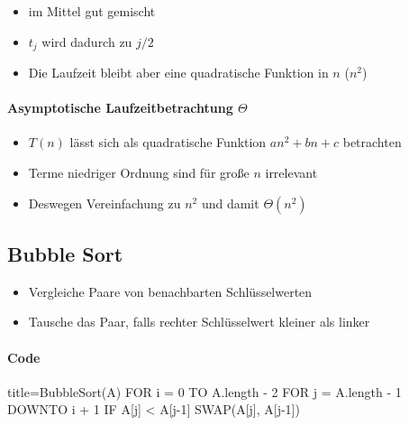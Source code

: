 \documentclass[
    ngerman,
    color=3b,
    dark_mode,
    load_common, %
    summary,
    boxarc,
]{rubos-tuda-template}
\begin{document}
\begin{description}[itemsep=1em]
    \item [\texttt{Average Case}]
          \begin{itemize}
              \item im Mittel gut gemischt
              \item $t_j$ wird dadurch zu $j/2$
              \item Die Laufzeit bleibt aber eine quadratische Funktion in $n$ ($n^2$)
          \end{itemize}
\end{description}

\paragraph{Asymptotische Laufzeitbetrachtung $\Theta$} {\label{insSortLaufzeitTheta}}
\begin{itemize}
    \item $T(n)$ lässt sich als quadratische Funktion $an^2 + bn + c$ betrachten
    \item Terme niedriger Ordnung sind für gro\ss e $n$ irrelevant
    \item Deswegen Vereinfachung zu $n^2$ und damit $\Theta(n^2)$
\end{itemize}
\clearpage
\subsection{Bubble Sort}\label{BubbleSort}
\begin{idea}\mbox{}
    \begin{itemize}
        \item Vergleiche Paare von benachbarten Schlüsselwerten
        \item Tausche das Paar, falls rechter Schlüsselwert kleiner als linker
    \end{itemize}
\end{idea}

\paragraph{Code}\mbox{}
\begin{codeBlock}[autogobble]{title=BubbleSort(A)}
    FOR i = 0 TO A.length - 2
        FOR j = A.length - 1 DOWNTO i + 1
            IF A[j] < A[j-1]
                SWAP(A[j], A[j-1])
\end{codeBlock}
\end{document}

